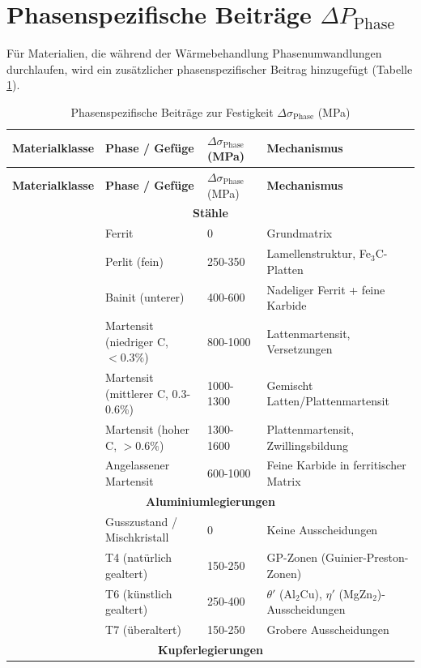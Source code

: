 \documentclass[12pt,a4paper]{article}
\begin{document}
	\section{Phasenspezifische Beiträge $\Delta P_{\text{Phase}}$}
	Für Materialien, die während der Wärmebehandlung Phasenumwandlungen durchlaufen, wird ein zusätzlicher phasenspezifischer Beitrag hinzugefügt (Tabelle \ref{tab:phase_contrib}).
	
	\begin{longtable}{p{3.5cm} p{3.0cm} p{3.0cm} p{4cm}}
		\caption{Phasenspezifische Beiträge zur Festigkeit $\Delta\sigma_{\text{Phase}}$ (MPa)}\label{tab:phase_contrib}\\
		\toprule
		\textbf{Materialklasse} & \textbf{Phase / Gefüge} & $\Delta\sigma_{\text{Phase}}$ (MPa) & \textbf{Mechanismus} \\
		\midrule
		\endfirsthead
		\toprule
		\textbf{Materialklasse} & \textbf{Phase / Gefüge} & $\Delta\sigma_{\text{Phase}}$ (MPa) & \textbf{Mechanismus} \\
		\midrule
		\endhead
		\multicolumn{4}{c}{\textbf{Stähle}} \\
		& Ferrit & 0 & Grundmatrix \\
		& Perlit (fein) & 250-350 & Lamellenstruktur, Fe$_3$C-Platten \\
		& Bainit (unterer) & 400-600 & Nadeliger Ferrit + feine Karbide \\
		& Martensit (niedriger C, $<0.3\%$) & 800-1000 & Lattenmartensit, Versetzungen \\
		& Martensit (mittlerer C, 0.3-0.6\%) & 1000-1300 & Gemischt Latten/Plattenmartensit \\
		& Martensit (hoher C, $>0.6\%$) & 1300-1600 & Plattenmartensit, Zwillingsbildung \\
		& Angelassener Martensit & 600-1000 & Feine Karbide in ferritischer Matrix \\
		\hline
		\multicolumn{4}{c}{\textbf{Aluminiumlegierungen}} \\
		& Gusszustand / Mischkristall & 0 & Keine Ausscheidungen \\
		& T4 (natürlich gealtert) & 150-250 & GP-Zonen (Guinier-Preston-Zonen) \\
		& T6 (künstlich gealtert) & 250-400 & $\theta'$ (Al$_2$Cu), $\eta'$ (MgZn$_2$)-Ausscheidungen \\
		& T7 (überaltert) & 150-250 & Grobere Ausscheidungen \\
		\hline
		\multicolumn{4}{c}{\textbf{Kupferlegierungen}} \\

\end{longtable}
\end{document}

